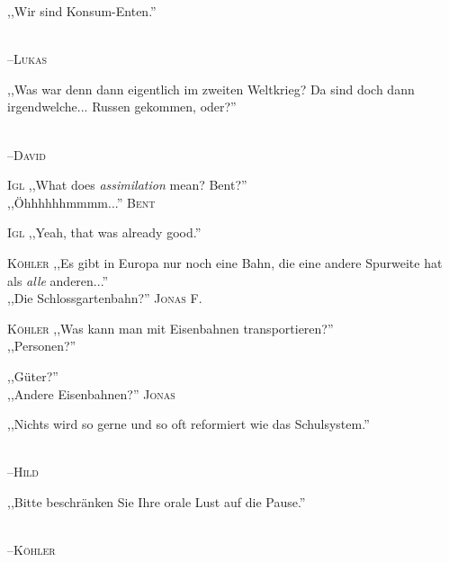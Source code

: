 \vspace{3mm}
{\raggedright ,,Wir sind Konsum-Enten.''}\\
\raggedleft \textsc{\footnotesize --\/Lukas}\\

\vspace{3mm}
{\raggedright ,,Was war denn dann eigentlich im zweiten Weltkrieg? Da sind doch dann irgendwelche... Russen gekommen, oder?''}\\
\raggedleft \textsc{\footnotesize --\/David}\\

\vspace{3mm}
\hangindent=0.7cm
\raggedright \textsc{\footnotesize Igl} ,,What does \emph{assimilation} mean? Bent?''\\
\raggedleft ,,Öhhhhhhmmmm...'' \textsc{\footnotesize Bent}\\
\hangindent=0.7cm
\raggedright \textsc{\footnotesize Igl} ,,Yeah, that was already good.''\\

\vspace{3mm}
\hangindent=0.7cm
\raggedright \textsc{\footnotesize Köhler} ,,Es gibt in Europa nur noch eine Bahn, die eine andere Spurweite hat als \emph{alle} anderen...''\\
\raggedleft ,,Die Schlossgartenbahn?'' \textsc{\footnotesize Jonas F.}\\

\vspace{3mm}
\hangindent=0.7cm
\raggedright \textsc{\footnotesize Köhler} ,,Was kann man mit Eisenbahnen transportieren?''\\
\raggedleft ,,Personen?'' \textsc{\footnotesize  }\\
\hangindent=0.7cm
\raggedright \textsc{\footnotesize  } ,,Güter?''\\
\raggedleft ,,Andere Eisenbahnen?'' \textsc{\footnotesize Jonas}\\

\vspace{3mm}
{\raggedright ,,Nichts wird so gerne und so oft reformiert wie das Schulsystem.''}\\
\raggedleft \textsc{\footnotesize --\/Hild}\\

\vspace{3mm}
{\raggedright ,,Bitte beschränken Sie Ihre orale Lust auf die Pause.''}\\
\raggedleft \textsc{\footnotesize --\/Köhler}\\

